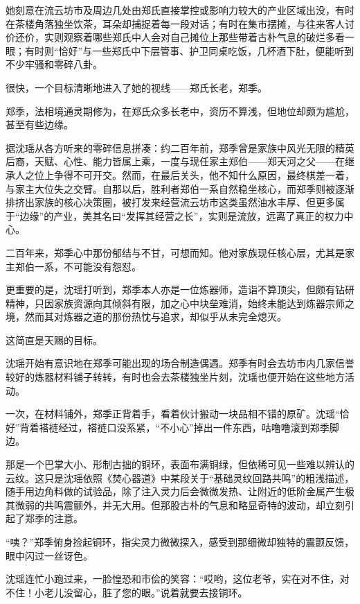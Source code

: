 她刻意在流云坊市及周边几处由郑氏直接掌控或影响力较大的产业区域出没，有时在茶楼角落独坐饮茶，耳朵却捕捉着每一段对话；有时在集市摆摊，与往来客人讨价还价，实则观察着哪些郑氏中人会对自己摊位上那些带着古朴气息的破烂多看一眼；有时则“恰好”与一些郑氏中下层管事、护卫同桌吃饭，几杯酒下肚，便能听到不少牢骚和零碎八卦。

很快，一个目标清晰地进入了她的视线——郑氏长老，郑季。

郑季，法相境通灵期修为，在郑氏众多长老中，资历不算浅，但地位却颇为尴尬，甚至有些边缘。

据沈瑶从各方听来的零碎信息拼凑：约二百年前，郑季曾是家族中风光无限的精英后裔，天赋、心性、能力皆属上乘，一度与现任家主郑伯——郑天河之父——在继承人之位上争得不可开交。然而，在最后关头，他不知什么原因，最终棋差一着，与家主大位失之交臂。自那以后，胜利者郑伯一系自然稳坐核心，而郑季则被逐渐排挤出家族的核心决策圈，被打发来经营流云坊市这类虽然油水丰厚、但更多属于“边缘”的产业，美其名曰“发挥其经营之长”，实则是流放，远离了真正的权力中心。

二百年来，郑季心中那份郁结与不甘，可想而知。他对家族现任核心层，尤其是家主郑伯一系，不可能没有怨怼。

更重要的是，沈瑶打听到，郑季本人亦是一位炼器师，造诣不算顶尖，但颇有钻研精神，只因家族资源向其倾斜有限，加之心中块垒难消，始终未能达到炼器宗师之境，然而其对炼器之道的那份热忱与追求，却似乎从未完全熄灭。

这简直是天赐的目标。

\vspace{2em}

沈瑶开始有意识地在郑季可能出现的场合制造偶遇。郑季有时会去坊市内几家信誉较好的炼器材料铺子转转，有时也会去茶楼独坐片刻，沈瑶也便开始在这些地方活动。

一次，在材料铺外，郑季正背着手，看着伙计搬动一块品相不错的原矿。沈瑶“恰好”背着褡裢经过，褡裢口没系紧，“不小心”掉出一件东西，咕噜噜滚到郑季脚边。

那是一个巴掌大小、形制古拙的铜环，表面布满铜绿，但依稀可见一些难以辨认的云纹。这只是沈瑶依照《焚心器道》中某段关于“基础灵纹回路共鸣”的粗浅描述，随手用边角料做的试验品，除了注入灵力后会微微发热、让附近的低阶金属产生极其微弱的共鸣震颤外，并无大用。但那股古朴的气息和略显奇特的波动，却立刻引起了郑季的注意。

“咦？”郑季俯身捡起铜环，指尖灵力微微探入，感受到那细微却独特的震颤反馈，眼中闪过一丝讶色。

沈瑶连忙小跑过来，一脸惶恐和市侩的笑容：“哎哟，这位老爷，实在对不住，对不住！小老儿没留心，脏了您的眼。”说着就要去接铜环。

